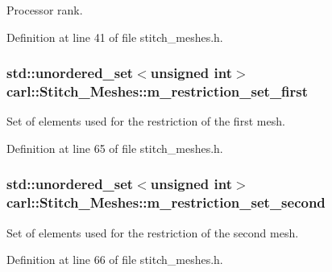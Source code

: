 Processor rank. 



Definition at line 41 of file stitch\+\_\+meshes.\+h.

\hypertarget{classcarl_1_1_stitch___meshes_a60ffa9c7303b4c3833d5a0df2ee5e7f5}{}
\subsubsection[{m\+\_\+restriction\+\_\+set\+\_\+first}]{\setlength{\rightskip}{0pt plus 5cm}std\+::unordered\+\_\+set$<$unsigned int$>$ carl\+::\+Stitch\+\_\+\+Meshes\+::m\+\_\+restriction\+\_\+set\+\_\+first\hspace{0.3cm}{\ttfamily [protected]}}\label{classcarl_1_1_stitch___meshes_a60ffa9c7303b4c3833d5a0df2ee5e7f5}


Set of elements used for the restriction of the first mesh. 



Definition at line 65 of file stitch\+\_\+meshes.\+h.

\hypertarget{classcarl_1_1_stitch___meshes_acb37d0d65327137309fa5b7815e4b71a}{}
\subsubsection[{m\+\_\+restriction\+\_\+set\+\_\+second}]{\setlength{\rightskip}{0pt plus 5cm}std\+::unordered\+\_\+set$<$unsigned int$>$ carl\+::\+Stitch\+\_\+\+Meshes\+::m\+\_\+restriction\+\_\+set\+\_\+second\hspace{0.3cm}{\ttfamily [protected]}}\label{classcarl_1_1_stitch___meshes_acb37d0d65327137309fa5b7815e4b71a}


Set of elements used for the restriction of the second mesh. 



Definition at line 66 of file stitch\+\_\+meshes.\+h.

\hypertarget{classcarl_1_1_stitch___meshes_abebb40f413d1dbce1d74f9280e978ed7}{}
